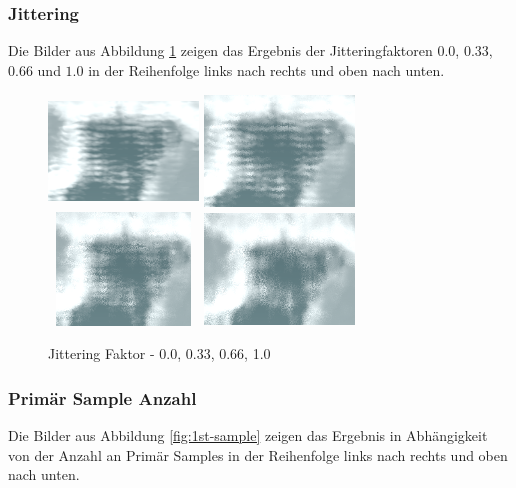 \subsubsection{Jittering}
Die Bilder aus Abbildung \ref{fig:jittering} zeigen das Ergebnis der Jitteringfaktoren $ 0.0 $, $ 0.33 $, $ 0.66 $ und $ 1.0 $ in der Reihenfolge links nach rechts und oben nach unten.

\begin{figure}[H]
    \centering
    \includegraphics[width=4cm, height=3cm]{figures/jittering-pic/jittering_0.0.png}
    \includegraphics[width=4cm, height=3cm]{figures/jittering-pic/jittering_0.33.png}
    \includegraphics[width=4cm, height=3cm]{figures/jittering-pic/jittering_0.66.png}
    \includegraphics[width=4cm, height=3cm]{figures/jittering-pic/jittering_1.0.png}
    \caption{Jittering Faktor - 0.0, 0.33, 0.66, 1.0}
    \label{fig:jittering}
\end{figure}

\subsubsection{Primär Sample Anzahl}
Die Bilder aus Abbildung \ref{fig:1st-sample} zeigen das Ergebnis in Abhängigkeit von der Anzahl an Primär Samples in der Reihenfolge links nach rechts und oben nach unten.

